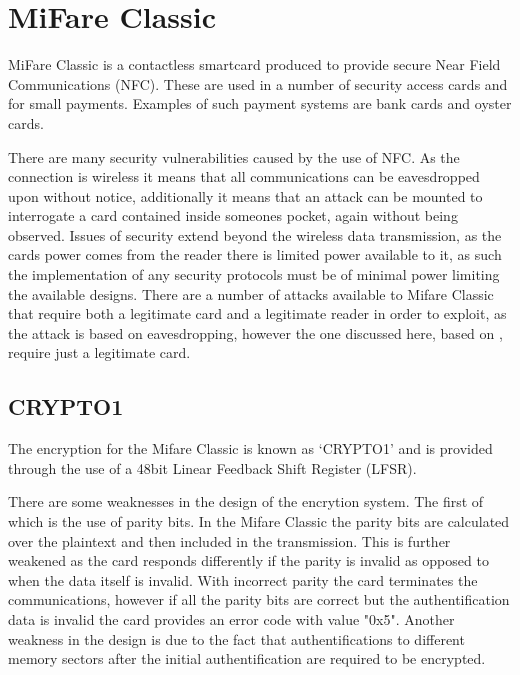 \section{MiFare Classic}

MiFare Classic is a contactless smartcard produced to provide secure Near Field Communications (NFC).
These are used in a number of security access cards and for small payments.
Examples of such payment systems are bank cards and oyster cards.

There are many security vulnerabilities caused by the use of NFC.
As the connection is wireless it means that all communications can be eavesdropped upon without notice, additionally it means that an attack can be mounted to interrogate a card contained inside someones pocket, again without being observed.
Issues of security extend beyond the wireless data transmission, as the cards power comes from the reader there is limited power available to it, as such the implementation of any security protocols must be of minimal power limiting the available designs.
There are a number of attacks available to Mifare Classic that require both a legitimate card and a legitimate reader in order to exploit, as the attack is based on eavesdropping, however the one discussed here, based on \cite{WirelessPickpocket}, require just a legitimate card.

\subsection{CRYPTO1}
The encryption for the Mifare Classic is known as `CRYPTO1' and is provided through the use of a 48bit Linear Feedback Shift Register (LFSR).

There are some weaknesses in the design of the encrytion system.
The first of which is the use of parity bits.
In the Mifare Classic the parity bits are calculated over the plaintext and then included in the transmission.
This is further weakened as the card responds differently if the parity is invalid as opposed to when the data itself is invalid.
With incorrect parity the card terminates the communications, however if all the parity bits are correct but the authentification data is invalid the card provides an error code with value "0x5".
Another weakness in the design is due to the fact that authentifications to different memory sectors after the initial authentification are required to be encrypted.

